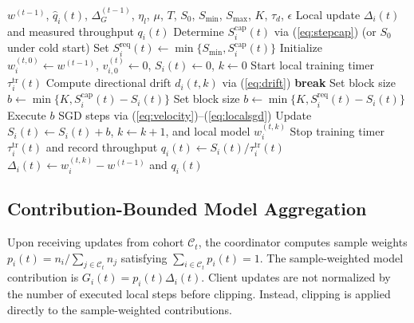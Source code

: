 \documentclass[conference]{IEEEtran}
\begin{document}
\begin{algorithm}[t]
\caption{Legacy Gating: Local Training}
\label{alg:client}
\begin{algorithmic}[1]
\REQUIRE $w^{(t-1)}$, $\widehat q_i(t)$, $\Delta_G^{(t-1)}$, $\eta_l$, $\mu$, $T$, $S_0$, $S_{\min}$, $S_{\max}$, $K$, $\tau_d$, $\epsilon$
\ENSURE Local update $\Delta_i(t)$ and measured throughput $q_i(t)$
\STATE Determine $S_i^{\mathrm{cap}}(t)$ via (\ref{eq:stepcap}) (or $S_0$ under cold start)
\STATE Set $S_i^{\mathrm{req}}(t) \leftarrow \min\{S_{\min}, S_i^{\mathrm{cap}}(t)\}$
\STATE Initialize $w_i^{(t,0)} \leftarrow w^{(t-1)}$, $v_{i,0}^{(t)} \leftarrow 0$, $S_i(t) \leftarrow 0$, $k \leftarrow 0$
\STATE Start local training timer $\tau_i^{\mathrm{tr}}(t)$
            \STATE Compute directional drift $d_i(t,k)$ via (\ref{eq:drift})
                \STATE \textbf{break} 
            \ENDIF
        \ENDIF
        \STATE Set block size $b \leftarrow \min\{K, S_i^{\mathrm{cap}}(t) - S_i(t)\}$
    \ELSE
        \STATE Set block size $b \leftarrow \min\{K, S_i^{\mathrm{req}}(t) - S_i(t)\}$
    \ENDIF
    \STATE Execute $b$ SGD steps via (\ref{eq:velocity})--(\ref{eq:localsgd})
    \STATE Update $S_i(t) \leftarrow S_i(t) + b$, $k \leftarrow k + 1$, and local model $w_i^{(t,k)}$
\ENDWHILE
\STATE Stop training timer $\tau_i^{\mathrm{tr}}(t)$ and record throughput $q_i(t) \leftarrow S_i(t) / \tau_i^{\mathrm{tr}}(t)$
\RETURN $\Delta_i(t) \leftarrow w_i^{(t,k)} - w^{(t-1)}$ and $q_i(t)$
\end{algorithmic}
\end{algorithm}

\subsection{Contribution-Bounded Model Aggregation}\label{subsec:influence}
Upon receiving updates from cohort $\mathcal{C}_t$, the coordinator computes sample weights $p_i(t) = n_i / \sum_{j \in \mathcal{C}_t} n_j$ satisfying $\sum_{i \in \mathcal{C}_t} p_i(t) = 1$. The sample-weighted model contribution is $G_i(t) = p_i(t) \Delta_i(t)$.  Client updates are not normalized by the number of executed local steps before clipping. Instead, clipping is applied directly to the sample-weighted contributions.
\end{document}
